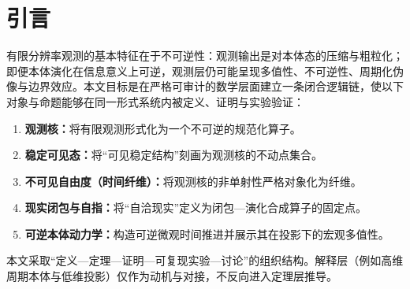 \section{引言}

有限分辨率观测的基本特征在于不可逆性：观测输出是对本体态的压缩与粗粒化；即便本体演化在信息意义上可逆，观测层仍可能呈现多值性、不可逆性、周期化伪像与边界效应。本文目标是在严格可审计的数学层面建立一条闭合逻辑链，使以下对象与命题能够在同一形式系统内被定义、证明与实验验证：
\begin{enumerate}
  \item \textbf{观测核：}将有限观测形式化为一个不可逆的规范化算子。
  \item \textbf{稳定可见态：}将“可见稳定结构”刻画为观测核的不动点集合。
  \item \textbf{不可见自由度（时间纤维）：}将观测核的非单射性严格对象化为纤维。
  \item \textbf{现实闭包与自指：}将“自洽现实”定义为闭包—演化合成算子的固定点。
  \item \textbf{可逆本体动力学：}构造可逆微观时间推进并展示其在投影下的宏观多值性。
\end{enumerate}

本文采取“定义—定理—证明—可复现实验—讨论”的组织结构。解释层（例如高维周期本体与低维投影）仅作为动机与对接，不反向进入定理层推导。

